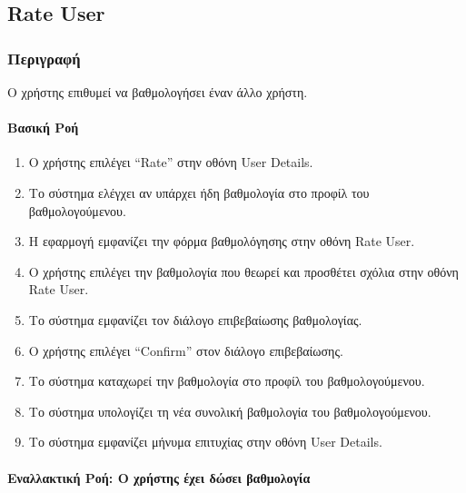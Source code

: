 \hypertarget{rate-user}{%
\subsection{Rate User}\label{rate-user}}

\hypertarget{ux3c0ux3b5ux3c1ux3b9ux3b3ux3c1ux3b1ux3c6ux3ae}{%
\subsubsection{Περιγραφή}\label{ux3c0ux3b5ux3c1ux3b9ux3b3ux3c1ux3b1ux3c6ux3ae}}

Ο χρήστης επιθυμεί να βαθμολογήσει έναν άλλο χρήστη.

\hypertarget{ux3b2ux3b1ux3c3ux3b9ux3baux3ae-ux3c1ux3bfux3ae}{%
\paragraph{Βασική
Ροή}\label{ux3b2ux3b1ux3c3ux3b9ux3baux3ae-ux3c1ux3bfux3ae}}

\begin{enumerate}
\def\labelenumi{\arabic{enumi}.}
\tightlist
\item
  Ο χρήστης επιλέγει ``Rate'' στην οθόνη User Details.
\item
  Το σύστημα ελέγχει αν υπάρχει ήδη βαθμολογία στο προφίλ του
  βαθμολογούμενου.
\item
  Η εφαρμογή εμφανίζει την φόρμα βαθμολόγησης στην οθόνη Rate User.
\item
  Ο χρήστης επιλέγει την βαθμολογία που θεωρεί και προσθέτει σχόλια στην
  οθόνη Rate User.
\item
  Το σύστημα εμφανίζει τον διάλογο επιβεβαίωσης βαθμολογίας.
\item
  Ο χρήστης επιλέγει ``Confirm'' στον διάλογο επιβεβαίωσης.
\item
  Το σύστημα καταχωρεί την βαθμολογία στο προφίλ του βαθμολογούμενου.
\item
  Το σύστημα υπολογίζει τη νέα συνολική βαθμολογία του βαθμολογούμενου.
\item
  Το σύστημα εμφανίζει μήνυμα επιτυχίας στην οθόνη User Details.
\end{enumerate}

\hypertarget{ux3b5ux3bdux3b1ux3bbux3bbux3b1ux3baux3c4ux3b9ux3baux3ae-ux3c1ux3bfux3ae-ux3bf-ux3c7ux3c1ux3aeux3c3ux3c4ux3b7ux3c2-ux3adux3c7ux3b5ux3b9-ux3b4ux3ceux3c3ux3b5ux3b9-ux3b2ux3b1ux3b8ux3bcux3bfux3bbux3bfux3b3ux3afux3b1}{%
\paragraph{Εναλλακτική Ροή: Ο χρήστης έχει δώσει
βαθμολογία}\label{ux3b5ux3bdux3b1ux3bbux3bbux3b1ux3baux3c4ux3b9ux3baux3ae-ux3c1ux3bfux3ae-ux3bf-ux3c7ux3c1ux3aeux3c3ux3c4ux3b7ux3c2-ux3adux3c7ux3b5ux3b9-ux3b4ux3ceux3c3ux3b5ux3b9-ux3b2ux3b1ux3b8ux3bcux3bfux3bbux3bfux3b3ux3afux3b1}}

